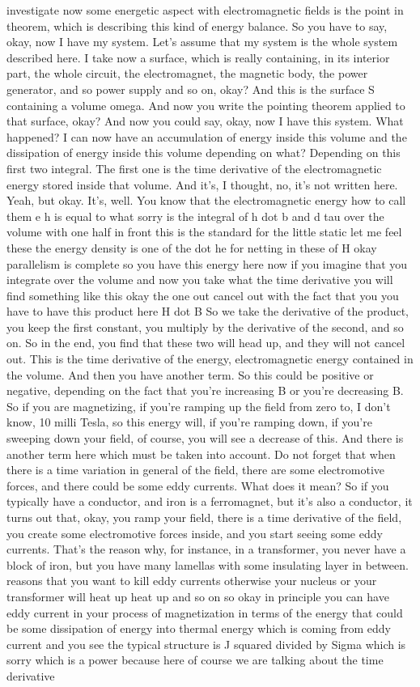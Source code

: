 investigate now some energetic aspect with electromagnetic fields is the point in theorem, which is describing this kind of energy balance. So you have to say, okay, now I have my system. Let's assume that my system is the whole system described here. I take now a surface, which is really containing, in its interior part, the whole circuit, the electromagnet, the magnetic body, the power generator, and so power supply and so on, okay? And this is the surface S containing a volume omega. And now you write the pointing theorem applied to that surface, okay? And now you could say, okay, now I have this system. What happened? I can now have an accumulation of energy inside this volume and the dissipation of energy inside this volume depending on what? Depending on this first two integral. The first one is the time derivative of the electromagnetic energy stored inside that volume. And it's, I thought, no, it's not written here. Yeah, but okay. It's, well. You know that the electromagnetic energy how to call them e h is equal to what sorry is the integral of h dot b and d tau over the volume with one half in front this is the standard for the little static let me feel these the energy density is one of the dot he for netting in these of H okay parallelism is complete so you have this energy here now if you imagine that you integrate over the volume and now you take what the time derivative you will find something like this okay the one out cancel out with the fact that you you have to have this product here H dot B So we take the derivative of the product, you keep the first constant, you multiply by the derivative of the second, and so on. So in the end, you find that these two will head up, and they will not cancel out. This is the time derivative of the energy, electromagnetic energy contained in the volume. And then you have another term. So this could be positive or negative, depending on the fact that you're increasing B or you're decreasing B. So if you are magnetizing, if you're ramping up the field from zero to, I don't know, 10 milli Tesla, so this energy will, if you're ramping down, if you're sweeping down your field, of course, you will see a decrease of this. And there is another term here which must be taken into account. Do not forget that when there is a time variation in general of the field, there are some electromotive forces, and there could be some eddy currents. What does it mean? So if you typically have a conductor, and iron is a ferromagnet, but it's also a conductor, it turns out that, okay, you ramp your field, there is a time derivative of the field, you create some electromotive forces inside, and you start seeing some eddy currents. That's the reason why, for instance, in a transformer, you never have a block of iron, but you have many lamellas with some insulating layer in between. reasons that you want to kill eddy currents otherwise your nucleus or your transformer will heat up heat up and so on so okay in principle you can have eddy current in your process of magnetization in terms of the energy that could be some dissipation of energy into thermal energy which is coming from eddy current and you see the typical structure is J squared divided by Sigma which is sorry which is a power because here of course we are talking about the time derivative 